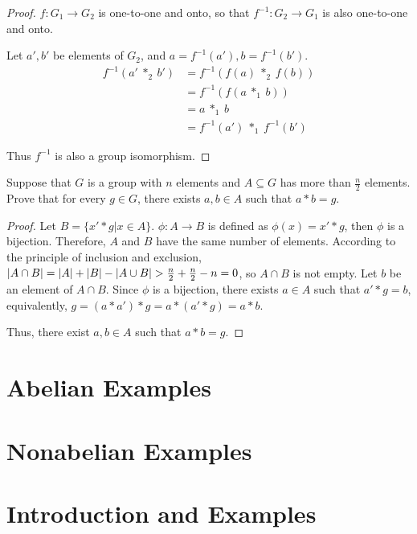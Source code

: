 \begin{proof}
    $f: G_{1} \to G_{2}$ is one-to-one and onto, so that $f^{-1}: G_{2} \to G_{1}$ is also one-to-one and onto.

    Let $a', b'$ be elements of $G_{2}$, and $a = f^{-1}(a'), b = f^{-1}(b')$.
    \begin{align*}
        f^{-1}(a'\ {*}_{2}\ b') & = f^{-1}(f(a)\ {*}_{2}\ f(b))     \\
                                & = f^{-1}(f(a\ {*}_{1}\ b))        \\
                                & = a\ {*}_{1}\ b                   \\
                                & = f^{-1}(a')\ {*}_{1}\ f^{-1}(b')
    \end{align*}

    Thus $f^{-1}$ is also a group isomorphism.
\end{proof}

\begin{exercise}
    Suppose that $G$ is a group with $n$ elements and $A\subseteq G$ has more than $\frac{n}{2}$ elements. Prove that for every $g\in G$, there exists $a, b\in A$ such that $a * b = g$.
\end{exercise}

\begin{proof}
    Let $B = \{ x' * g \vert x\in A \}$. $\phi: A\to B$ is defined as $\phi(x) = x' * g$, then $\phi$ is a bijection. Therefore, $A$ and $B$ have the same number of elements. According to the principle of inclusion and exclusion, $\left\vert{A\cap B}\right\vert = \left\vert{A}\right\vert + \left\vert{B}\right\vert - \left\vert{A\cup B}\right\vert > \frac{n}{2} + \frac{n}{2} - n = 0$, so $A\cap B$ is not empty. Let $b$ be an element of $A\cap B$. Since $\phi$ is a bijection, there exists $a\in A$ such that $a' * g = b$, equivalently, $g = (a * a') * g = a * (a' * g) = a * b$.

    Thus, there exist $a, b\in A$ such that $a * b = g$.
\end{proof}

\section{Abelian Examples}


\section{Nonabelian Examples}

\section{Introduction and Examples}
\setcounter{exercise}{0}

